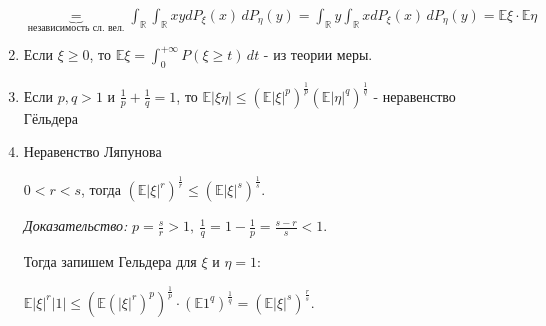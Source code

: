 \begin{properties}
\begin{enumerate}
{            $\underbrace{=}_{\text{независимость сл. вел.}} \int_{\mathbb{R}} \int_{\mathbb{R}} xy dP_{\xi} (x) \, dP_{\eta} (y) =
            \int_{\mathbb{R}} y \int_{\mathbb{R}} x dP_{\xi} (x) \, dP_{\eta} (y) = \mathbb{E} \xi \cdot \mathbb{E} \eta$
        }
        \item {
            Если $\xi \geqslant 0$, то $\mathbb{E} \xi = \int_{0}^{+\infty} P(\xi \geqslant t) \, dt$ - из теории меры.
        }
        \item {
            Если $p, q > 1$ и $\frac{1}{p} + \frac{1}{q} = 1$, то $\mathbb{E}|\xi \eta| \leqslant (\mathbb{E}|\xi|^p)^{\frac{1}{p}} (\mathbb{E} |\eta|^q)^{\frac{1}{q}}$ - 
            неравенство Гёльдера
        }
        \item {
            Неравенство Ляпунова

            $0 < r < s$, тогда $(\mathbb{E} |\xi| ^ r)^{\frac{1}{r}} \leqslant (\mathbb{E}|\xi|^s)^{\frac{1}{s}}$.

            \textit{Доказательство:} $p = \frac{s}{r} > 1, \ \frac{1}{q} = 1 - \frac{1}{p} = \frac{s - r}{s} < 1$.

            Тогда запишем Гельдера для $\xi$ и $\eta = 1$:
            
            $\mathbb{E} |\xi|^r |1| \leq \left(\mathbb{E} (|\xi|^r)^p \right)^{\frac{1}{p}} \cdot \left( \mathbb{E} 1^q \right)^{\frac{1}{q}} = \left( \mathbb{E} |\xi|^s \right)^{\frac{r}{s}}$.
            

        }
    \end{enumerate}
\end{properties}